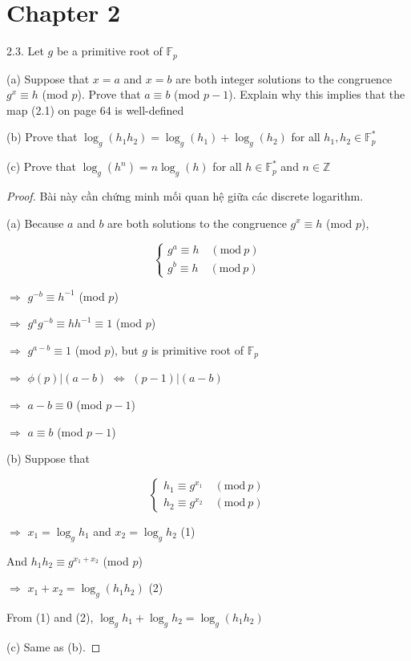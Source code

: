 \section{Chapter 2}

2.3. Let $g$ be a primitive root of $\mathbb{F}_p$

(a) Suppose that $x = a$ and $x = b$ are both integer solutions to the congruence $g^x \equiv h$ (mod $p$). Prove that $a \equiv b$ (mod $p-1$). Explain why this implies that the map (2.1) on page 64 is well-defined

(b) Prove that $\log_g(h_1 h_2) = \log_g(h_1) + \log_g(h_2)$ for all $h_1, h_2 \in \mathbb{F}^*_p$

(c) Prove that $\log_g(h^n) = n\log_g(h)$ for all $h \in \mathbb{F}^{*}_p$ and $n \in \mathbb{Z}$

\begin{proof}
    Bài này cần chứng minh mối quan hệ giữa các discrete logarithm.

    (a) Because $a$ and $b$ are both solutions to the congruence $g^x \equiv h$ (mod $p$),

    \begin{equation*}
        \begin{cases}
        g^a \equiv h \quad (\text{mod}\ p) \\
        g^b \equiv h \quad (\text{mod}\ p)
        \end{cases}
    \end{equation*}

    $\Rightarrow$ $g^{-b} \equiv h^{-1}$ (mod $p$)
    
    $\Rightarrow$ $g^ag^{-b} \equiv hh^{-1} \equiv 1$ (mod $p$)
    
    $\Rightarrow$ $g^{a-b} \equiv 1$ (mod $p$), but $g$ is primitive root of $\mathbb{F}_p$
    
    $\Rightarrow$ $\phi(p) | (a-b)$ $\Leftrightarrow$ $(p-1) | (a-b)$
    
    $\Rightarrow$ $a - b \equiv 0$ (mod $p-1$)
    
    $\Rightarrow$ $a \equiv b$ (mod $p-1$)

    (b) Suppose that 
    
    \begin{equation*}
        \begin{cases}
        h_1 \equiv g^{x_1} \quad (\text{mod}\ p) \\
        h_2 \equiv g^{x_2} \quad (\text{mod}\ p)
        \end{cases}
    \end{equation*}
    
    $\Rightarrow$ $x_1=\log_g h_1$ and $x_2=\log_g h_2$ (1)
    
    And $h_1 h_2 \equiv g^{x_1 + x_2}$ (mod $p$)
    
    $\Rightarrow$ $x_1 + x_2 = \log_g(h_1 h_2)$ (2)
    
    From (1) and (2), $\log_g h_1 + \log_g h_2 = \log_g (h_1 h_2)$
    
    (c) Same as (b).

\end{proof}

